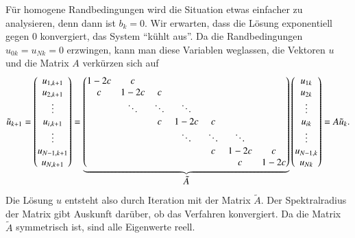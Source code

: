 Für homogene Randbedingungen wird die Situation etwas einfacher zu
analysieren, denn dann ist $b_k=0$.
%
%
Wir erwarten, dass die Lösung exponentiell gegen $0$ konvergiert,
das System ``kühlt aus''.
%
Da die Randbedingungen $u_{0k}=u_{Nk}=0$ erzwingen, kann man diese 
Variablen weglassen, die Vektoren $u$ und die Matrix $A$ verkürzen sich auf
\begin{equation}
\tilde{u}_{k+1}
=
\begin{pmatrix}
u_{1,k+1}\\
u_{2,k+1}\\
\vdots\\
u_{i,k+1}\\
\vdots\\
u_{N-1,k+1}\\
u_{N,k+1}
\end{pmatrix}
=
\underbrace{
\begin{pmatrix}
 1-2c &  c   &      &      &      &      &      \\
  c   & 1-2c &  c   &      &      &      &      \\
      &\ddots&\ddots&\ddots&      &      &      \\
      &      &  c   & 1-2c &  c   &      &      \\
      &      &      &\ddots&\ddots&\ddots&      \\
      &      &      &      &  c   & 1-2c &  c   \\
      &      &      &      &      &  c   & 1-2c \\
\end{pmatrix}}_{\displaystyle \tilde{A}\mathstrut}
\begin{pmatrix}
u_{1k}\\
u_{2k}\\
\vdots\\
u_{ik}\\
\vdots\\
u_{N-1,k}\\
u_{Nk}
\end{pmatrix}
=
A
\tilde{u}_k.
\end{equation}
Die Lösung $u$ entsteht also durch Iteration mit der Matrix $\tilde{A}$.
Der Spektralradius der Matrix gibt Auskunft darüber, ob das Verfahren
konvergiert.
%
Da die Matrix $\tilde{A}$ symmetrisch ist, sind alle Eigenwerte reell.
%
